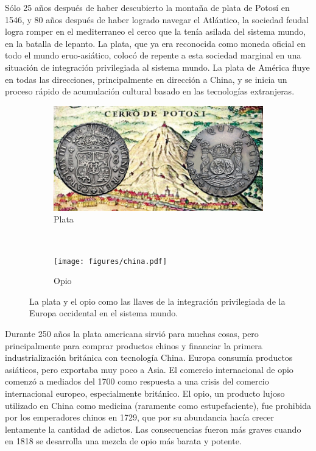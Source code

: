 \documentclass[a4paper,10pt]{book}
\theoremstyle{definition}
\begin{document}
Sólo 25 años después de haber descubierto la montaña de plata de Potosí en 1546, y 80 años después de haber logrado navegar el Atlántico, la sociedad feudal logra romper en el mediterraneo el cerco que la tenía asilada del sistema mundo, en la batalla de lepanto.
La plata, que ya era reconocida como moneda oficial en todo el mundo eruo-asiático, colocó de repente a esta sociedad marginal en una situación de integración privilegiada al sistema mundo.
La plata de América fluye en todas las direcciones, principalmente en dirección a China, y se inicia un proceso rápido de acumulación cultural basado en las tecnologías extranjeras.
\begin{figure}[ht!]     
  \centering 
  \begin{subfigure}[b]{0.48\textwidth}
    \includegraphics[width=\textwidth]{static/plata-potosi} 
    \caption{Plata}
    \label{fig:potosi}
  \end{subfigure}
   \ \ 
  \begin{subfigure}[b]{0.47\textwidth}
    \texttt{[image: figures/china.pdf]} 
   \caption{Opio}
    \label{fig:china-pop}
  \end{subfigure}
  \caption{La plata y el opio como las llaves de la integración privilegiada de la Europa occidental en el sistema mundo.}
  \label{fig:integracion}
\end{figure}
Durante 250 años la plata americana sirvió para muchas cosas, pero principalmente para comprar productos chinos y financiar la primera industrialización británica con tecnología China.
Europa consumía productos asiáticos, pero exportaba muy poco a Asia.
El comercio internacional de opio comenzó a mediados del 1700 como respuesta a una crisis del comercio internacional europeo, especialmente británico.
El opio, un producto lujoso utilizado en China como medicina (raramente como estupefaciente), fue prohibida por los emperadores chinos en 1729, que por su abundancia hacía crecer lentamente la cantidad de adictos.
Las consecuencias fueron más graves cuando en 1818 se desarrolla una mezcla de opio más barata y potente.
\end{document}
